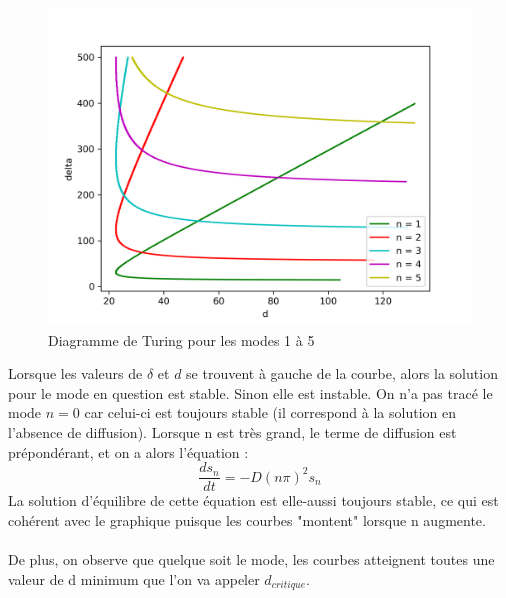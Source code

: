 \documentclass[12pt,a4paper]{article}
\begin{document}
\begin{figure}[h!]
\begin{center}
\includegraphics[scale=0.8]{diagrammes_turing_bis2.png}
\caption{Diagramme de Turing pour les modes 1 à 5}
\end{center}
\end{figure}

Lorsque les valeurs de $\delta$ et $d$ se trouvent à gauche de la courbe, alors la solution pour le mode en question est stable. Sinon elle est instable. On n'a pas tracé le mode $n=0$ car celui-ci est toujours stable (il correspond à la solution en l'absence de diffusion). Lorsque n est très grand, le terme de diffusion est prépondérant, et on a alors l'équation :
\begin{equation}
    \frac{ds_{n}}{dt} = -D(n\pi)^{2}s_{n}
\end{equation}
La solution d'équilibre de cette équation est elle-aussi toujours stable, ce qui est cohérent avec le graphique puisque les courbes "montent" lorsque n augmente. \\ \\
De plus, on observe que quelque soit le mode, les courbes atteignent toutes une valeur de d minimum que l'on va appeler $d_{critique}$.
\end{document}
